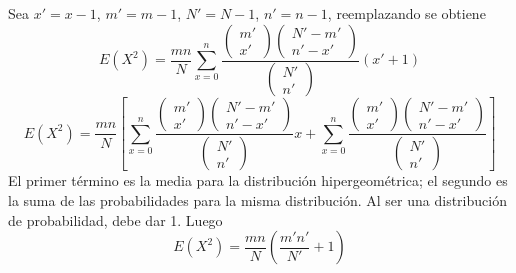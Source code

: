 \documentclass[12pt]{article}
\begin{document}
                Sea $x'=x-1$, $m'=m-1$, $N'=N-1$, $n'=n-1$, reemplazando se obtiene
                \begin{equation*}
                	E(X^2)=\frac { mn }{ N } \sum _{ x=0 }^{ n }{ \frac { \left( \begin{matrix} m' \\ x' \end{matrix} \right) \left( \begin{matrix} N'-m' \\ n'-x' \end{matrix} \right)  }{ \left( \begin{matrix} N' \\ n' \end{matrix} \right)  } { (x'+1) } } 
                \end{equation*}
                \begin{equation*}
                	E(X^2)=\frac { mn }{ N } \left[ \sum _{ x=0 }^{ n }{ \frac { \left( \begin{matrix} m' \\ x' \end{matrix} \right) \left( \begin{matrix} N'-m' \\ n'-x' \end{matrix} \right)  }{ \left( \begin{matrix} N' \\ n' \end{matrix} \right)  } { x } } + \sum _{ x=0 }^{ n }{ \frac { \left( \begin{matrix} m' \\ x' \end{matrix} \right) \left( \begin{matrix} N'-m' \\ n'-x' \end{matrix} \right)  }{ \left( \begin{matrix} N' \\ n' \end{matrix} \right)  } } \right]
                \end{equation*}
                El primer término es la media para la distribución hipergeométrica; el segundo es la suma de las probabilidades para la misma distribución. Al ser una distribución de probabilidad, debe dar 1. Luego
                \begin{equation*}
                	E(X^2)=\frac{mn}{N}\left(\frac{m'n'}{N'}+1\right)
                \end{equation*}
\end{document}

